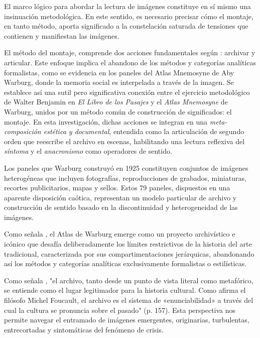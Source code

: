 El marco lógico para abordar la lectura de imágenes constituye en sí mismo una insinuación metodológica. En este sentido, es necesario precisar cómo el montaje, en tanto método, aporta significado a la constelación saturada de tensiones que contienen y manifiestan las imágenes.

El método del montaje, comprende dos acciones fundamentales según \parencite{Guasch2005}: archivar y articular. Este enfoque implica el abandono de los métodos y categorías analíticas formalistas, como se evidencia en los paneles del Atlas Mnemosyne de Aby Warburg, donde la memoria social es interpelada a través de la imagen. Se establece así una sutil pero significativa conexión entre el ejercicio metodológico de Walter Benjamin en \textit{El Libro de los Pasajes} y el \textit{Atlas Mnemosyne} de Warburg, unidos por un método común de construcción de significados: el montaje. \textcolor{edit30sept}{En esta investigación, dichas acciones se integran en una \textit{meta-composición estética y documental}, entendida como la articulación de segundo orden que reescribe el archivo en escenas, habilitando una lectura reflexiva del \textit{síntoma} y el \textit{anacronismo} como operadores de sentido.}

Los paneles que Warburg construyó en 1925 constituyen conjuntos de imágenes heterogéneas que incluyen fotografías, reproducciones de grabados, miniaturas, recortes publicitarios, mapas y sellos. Estos 79 paneles, dispuestos en una aparente disposición caótica, representan un modelo particular de archivo y construcción de sentido basado en la discontinuidad y heterogeneidad de las imágenes.

Como señala \parencite{Guasch2011}, el Atlas de Warburg emerge como un proyecto archivístico e icónico que desafía deliberadamente los límites restrictivos de la historia del arte tradicional, caracterizada por sus compartimentaciones jerárquicas, abandonando así los métodos y categorías analíticas exclusivamente formalistas o estilísticas.

Como señala \parencite{Guasch2005}, "el archivo, tanto desde un punto de vista literal como metafórico, se entiende como el lugar legitimador para la historia cultural. Como afirma el filósofo Michel Foucault, el archivo es el sistema de «enunciabilidad» a través del cual la cultura se pronuncia sobre el pasado" (p. 157). Esta perspectiva nos permite navegar el entramado de imágenes emergentes, originarias, turbulentas, entrecortadas y sintomáticas del fenómeno de crisis.

